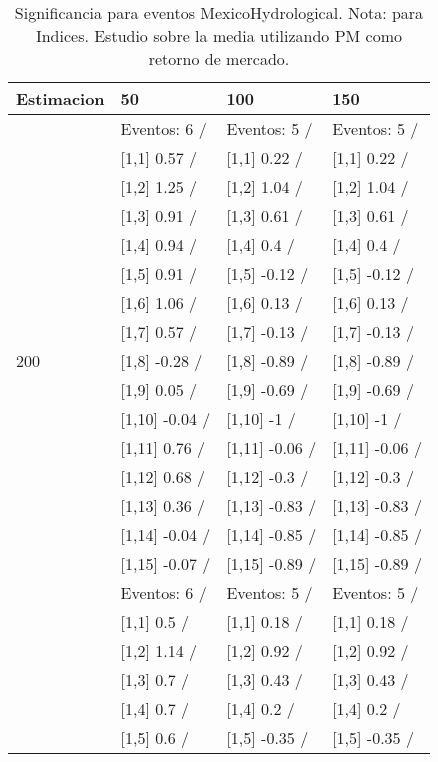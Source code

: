 \begin{table}

\caption{Significancia para eventos MexicoHydrological. Nota: para Indices. Estudio sobre la media utilizando PM como retorno de mercado.}
\centering
\begin{tabular}[t]{llll}
\toprule
Estimacion & 50 & 100 & 150\\
\midrule
 & Eventos:  6 / & Eventos:  5 / & Eventos:  5 /\\
 & {}[1,1] 0.57  / & {}[1,1] 0.22  / & {}[1,1] 0.22  /\\
 & {}[1,2] 1.25  / & {}[1,2] 1.04  / & {}[1,2] 1.04  /\\
 & {}[1,3] 0.91  / & {}[1,3] 0.61  / & {}[1,3] 0.61  /\\
 & {}[1,4] 0.94  / & {}[1,4] 0.4  / & {}[1,4] 0.4  /\\
\addlinespace
 & {}[1,5] 0.91  / & {}[1,5] -0.12  / & {}[1,5] -0.12  /\\
 & {}[1,6] 1.06  / & {}[1,6] 0.13  / & {}[1,6] 0.13  /\\
 & {}[1,7] 0.57  / & {}[1,7] -0.13  / & {}[1,7] -0.13  /\\
200 & {}[1,8] -0.28  / & {}[1,8] -0.89  / & {}[1,8] -0.89  /\\
 & {}[1,9] 0.05  / & {}[1,9] -0.69  / & {}[1,9] -0.69  /\\
\addlinespace
 & {}[1,10] -0.04  / & {}[1,10] -1  / & {}[1,10] -1  /\\
 & {}[1,11] 0.76  / & {}[1,11] -0.06  / & {}[1,11] -0.06  /\\
 & {}[1,12] 0.68  / & {}[1,12] -0.3  / & {}[1,12] -0.3  /\\
 & {}[1,13] 0.36  / & {}[1,13] -0.83  / & {}[1,13] -0.83  /\\
 & {}[1,14] -0.04  / & {}[1,14] -0.85  / & {}[1,14] -0.85  /\\
\addlinespace
 & {}[1,15] -0.07  / & {}[1,15] -0.89  / & {}[1,15] -0.89  /\\
 & Eventos:  6 / & Eventos:  5 / & Eventos:  5 /\\
 & {}[1,1] 0.5  / & {}[1,1] 0.18  / & {}[1,1] 0.18  /\\
 & {}[1,2] 1.14  / & {}[1,2] 0.92  / & {}[1,2] 0.92  /\\
 & {}[1,3] 0.7  / & {}[1,3] 0.43  / & {}[1,3] 0.43  /\\
\addlinespace
 & {}[1,4] 0.7  / & {}[1,4] 0.2  / & {}[1,4] 0.2  /\\
 & {}[1,5] 0.6  / & {}[1,5] -0.35  / & {}[1,5] -0.35  /\\

\end{tabular}
\end{table}
